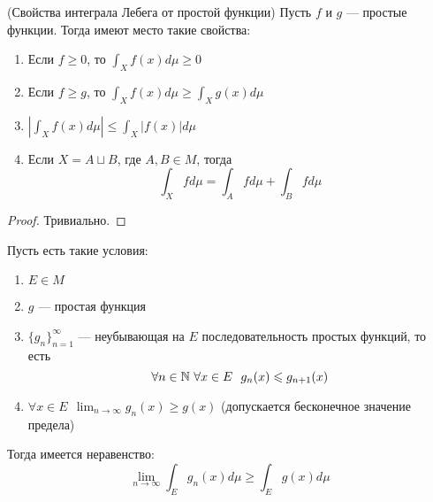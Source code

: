 \begin{theorem} (Свойства интеграла Лебега от простой функции)
	Пусть $f$ и $g$ --- простые функции. Тогда имеют место такие свойства:
	\begin{enumerate}
		\item Если $f \ge 0$, то $\int_X f(x)d\mu \ge 0$
		
		\item Если $f \ge g$, то $\int_X f(x)d\mu \ge \int_X g(x)d\mu$
		
		\item $\left|\int_X f(x)d\mu\right| \le \int_X |f(x)|d\mu$
		
		\item Если $X = A \sqcup B$, где $A, B \in M$, тогда
		\[
			\int_X fd\mu = \int_A fd\mu + \int_B fd\mu
		\]
	\end{enumerate}
\end{theorem}

\begin{proof}
	Тривиально.
\end{proof}

\begin{theorem}
	Пусть есть такие условия:
	\begin{enumerate}
		\item $E \in M$
		
		\item $g$ --- простая функция
		
		\item $\{g_n\}_{n = 1}^\infty$ --- неубывающая на $E$ последовательность простых функций, то есть
		\[
			\forall n \in \mathbb{N}\ \forall x \in E\ \ g_n(x) \leqslant g_{n + 1}(x)
		\]
		
		\item $\forall x \in E\ \ \lim_{n \to \infty} g_n(x) \ge g(x)$ (допускается бесконечное значение предела)
	\end{enumerate}
	Тогда имеется неравенство:
	\[
		\lim_{n \to \infty} \int_E g_n(x)d\mu \ge \int_E g(x)d\mu
	\]
\end{theorem}

